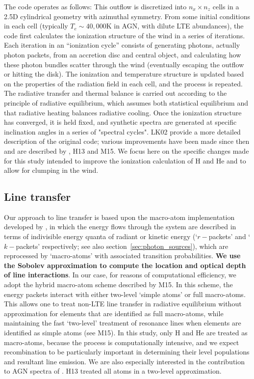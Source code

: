 \documentclass[useAMS,usenatbib]{mn2e_x}
\begin{document}
The code operates as follows:   This outflow is discretized into $n_x \times n_z$ cells in a 2.5D
cylindrical geometry with azimuthal symmetry. 
From some initial conditions in each cell (typically $T_e \sim 40,000$K in AGN, with 
dilute LTE abundances), 
the code first calculates the ionization structure of the wind in a series of iterations. 
Each iteration in an ``ionization cycle'' consists of generating photons, actually photon packets, 
from an accretion disc and central object, and calculating how these photon 
bundles scatter through the wind (eventually escaping the outflow or hitting the disk). 
The ionization and temperature structure is updated based on the properties of the 
radiation field in each cell, and the process is repeated. The radiative transfer and thermal
balance is carried out according to the principle of radiative equilibrium, 
which assumes both statistical equilibrium and that radiative heating balances radiative cooling.
Once the ionization structure has converged, it is held fixed, 
and synthetic spectra are generated at specific inclination 
angles in a series of "spectral cycles". LK02 provide a more detailed  
description of the original code; various improvements have been made 
since then and are described by \cite{simmacro2005}, H13 and M15.  
We focus here on the specific changes made for this study
intended to improve the ionization calculation of H and He
and to allow for clumping in the wind.


\subsection{Line transfer}

Our approach to line transfer is based upon the macro-atom implementation developed by 
\cite{lucy2002, lucy2003}, in which the energy flows through the system are described in 
terms of indivisible energy quanta of radiant or kinetic energy 
(`$r-$packets' and `$k-$packets' respectively; see also section~\ref{sec:photon_sources}),
which are reprocessed by `macro-atoms' with associated transition probabilities.
{\bf We use the Sobolev approximation \citep[e.g.][]{sobolev1957,sobolev1960,rybickihummer1978}
to compute the location and optical depth of line interactions}.
In our case, for reasons of computational efficiency, we adopt the  hybrid macro-atom scheme 
described by M15. In this scheme, the energy packets interact with either two-level 
`simple atoms' or full macro-atoms. 
This allows one to treat non-LTE line transfer in radiative equilibrium
without approximation for elements that are identified as 
full macro-atoms, while maintaining the fast `two-level' 
treatment of resonance lines when elements are identified 
as simple atoms (see M15). In this study,
only H and He are treated as macro-atoms, because the process is computationally
intensive, and we expect recombination to be particularly important
in determining their level populations and resultant line emission.
We are also especially interested in the contribution to 
AGN spectra of \LA.  H13 treated all atoms in a two-level approximation.  
\end{document}
